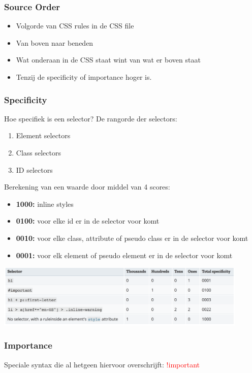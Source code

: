 \documentclass{article}
\newcommand{\bold}[1]{\textbf{#1}}
\begin{document}
\subsubsection{Source Order}
\begin{itemize}
    \item Volgorde van CSS rules in de CSS file
    \item Van boven naar beneden
    \item Wat onderaan in de CSS staat wint van wat er boven staat
    \item Tenzij de specificity of importance hoger is.
\end{itemize}

\subsubsection{Specificity}
Hoe specifiek is een selector? De rangorde der selectors: 
\begin{enumerate}
    \item Element selectors
    \item Class selectors
    \item ID selectors
\end{enumerate}
Berekening van een waarde door middel van 4 scores:
\begin{itemize}
    \item \bold{1000: } inline styles
    \item \bold{0100: } voor elke id er in de selector voor komt
    \item \bold{0010: } voor elke class, attribute of pseudo class er in de selector voor komt
    \item \bold{0001: } voor elk element of pseudo element er in de selector voor komt
\end{itemize}

\includegraphics[width=0.9\textwidth]{img/Screenshot_20200212_152940.png}

\subsubsection{Importance}
Speciale syntax die al hetgeen hiervoor overschrijft: \textcolor{red}{!important}
\end{document}
